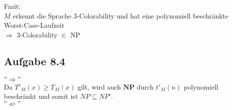 Fazit:\\
$M$ erkennt die Sprache 3-Colorability und hat eine polynomiell beschränkte Worst-Case-Laufzeit\\
$\Rightarrow$ 3-Colorability $\in$ NP


\subsection*{Aufgabe 8.4}
$"\Rightarrow"$\\
Da $T'_M(x) \ge T_M(x)$ gilt, wird auch $\textbf{NP}$ durch $t'_M(n)$ polynomiell beschränkt und somit ist $NP \subseteq NP'$.\\
$"\Leftarrow"$\\


